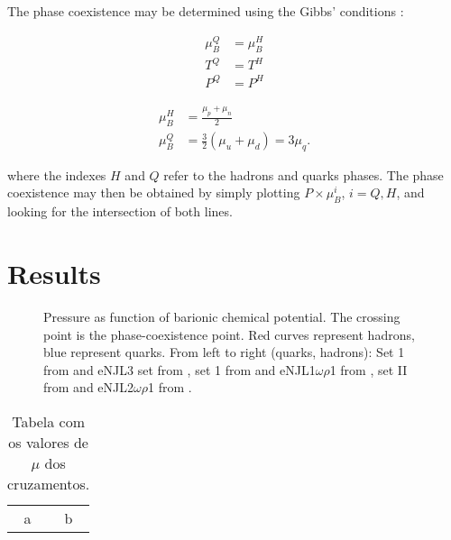 \documentclass[plainsections,alongposter]{sciposterlocal}
\begin{document}
\begin{multicols}{2}
The phase coexistence may be determined using the Gibbs' conditions \cite{Cavagnoli2011}:

\begin{minipage}{0.5\columnwidth}
\begin{align*}
\mu_B^Q &= \mu_B^H\\
T^Q &= T^H \\
P^Q &= P^H
\end{align*}
\end{minipage}
\begin{minipage}{0.5\columnwidth}
\begin{align*}
	\mu_B^H &= \frac{\mu_p + \mu_n}{2} \\
	\mu_B^Q &= \frac{3}{2} (\mu_u + \mu_d) = 3 \mu_q.
\end{align*}
\end{minipage}

\noindent{}where the indexes $H$ and $Q$ refer to the hadrons and quarks phases. The phase coexistence may then be obtained by simply plotting $P \times \mu_B^i$, $i = Q, H$, and looking for the intersection of both lines.

\section*{Results}

\begin{figure}

\caption{Pressure as function of barionic chemical potential. The crossing point is the phase-coexistence point. Red curves represent hadrons, blue represent quarks. From left to right (quarks, hadrons): Set 1 from \cite{Buballa1996} and eNJL3 set from \cite{Pais2016}, set 1 from \cite{Buballa1996} and eNJL1$\omega\rho$1 from \cite{Pais2016}, set II from \cite{Buballa2005} and eNJL2$\omega\rho$1 from \cite{Pais2016}.}
\end{figure}

\begin{table}
\caption{Tabela com os valores de $\mu$ dos cruzamentos.}
\begin{tabular}{cc}
a & b \\
\end{tabular}
\end{table}

%

{ \footnotesize

}

\end{multicols}
\end{document}
